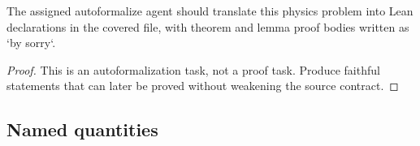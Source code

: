 \begin{theorem}
\label{thm:physics:IPhO_2026_3_C_4:target}
The assigned autoformalize agent should translate this physics problem into Lean declarations in the covered file, with theorem and lemma proof bodies written as `by sorry`.
\end{theorem}
\begin{proof}
This is an autoformalization task, not a proof task. Produce faithful statements that can later be proved without weakening the source contract.
\end{proof}


\subsection*{Named quantities}

